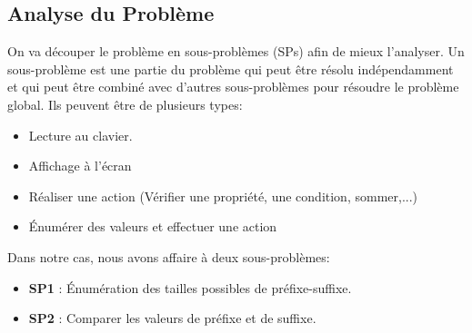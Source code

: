 \subsection{Analyse du Problème}

On va découper le problème en sous-problèmes (SPs) afin de mieux l'analyser.
Un sous-problème est une partie du problème qui peut être résolu indépendamment
et qui peut être combiné avec d'autres sous-problèmes pour résoudre le problème
global. Ils peuvent être de plusieurs types:
\begin{itemize}
   \item Lecture au clavier.
   \item Affichage à l'écran
   \item Réaliser une action (Vérifier une propriété, une condition, sommer,...)
   \item \'Enumérer des valeurs et effectuer une action
\end{itemize}
Dans notre cas, nous avons affaire à deux sous-problèmes:
\begin{itemize}
   \item \textbf{SP1} : \'Enumération des tailles possibles de préfixe-suffixe.
   \item \textbf{SP2} : Comparer les valeurs de préfixe et de suffixe.
\end{itemize}